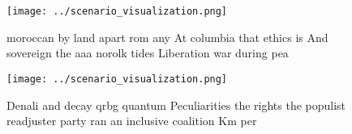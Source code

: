 \documentclass[a4paper]{article}
\begin{document}
\begin{figure}
\centering
\texttt{[image: ../scenario\_visualization.png]}
\caption{ moroccan by land apart rom any At columbia that ethics is And sovereign the aaa norolk tides Liberation war during pea
}
\end{figure}
 
\begin{figure}
\centering
\texttt{[image: ../scenario\_visualization.png]}
\caption{Denali and decay qrbg quantum Peculiarities the rights the populist readjuster party ran an inclusive coalition Km per 
}
\end{figure}
 
\end{document}
